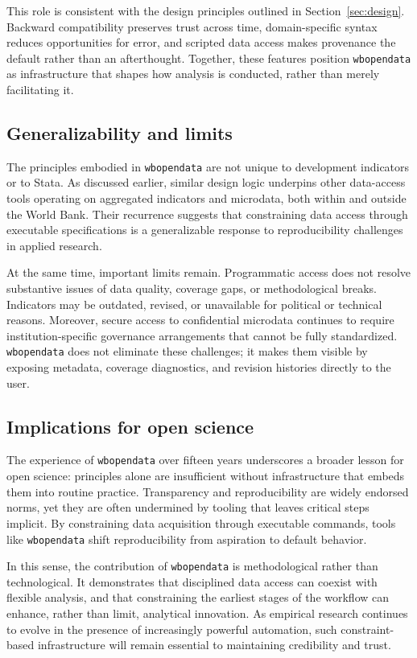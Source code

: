 \documentclass[bib]{statapress}
\begin{document}
This role is consistent with the design principles outlined in Section~\ref{sec:design}.
Backward compatibility preserves trust across time, domain-specific syntax
reduces opportunities for error, and scripted data access makes provenance the
default rather than an afterthought. Together, these features position
\texttt{wbopendata} as infrastructure that shapes how analysis is conducted,
rather than merely facilitating it.

\subsection{Generalizability and limits}

The principles embodied in \texttt{wbopendata} are not unique to development
indicators or to Stata. As discussed earlier, similar design logic underpins
other data-access tools operating on aggregated indicators and microdata, both
within and outside the World Bank. Their recurrence suggests that constraining
data access through executable specifications is a generalizable response to
reproducibility challenges in applied research.

At the same time, important limits remain. Programmatic access does not resolve
substantive issues of data quality, coverage gaps, or methodological breaks.
Indicators may be outdated, revised, or unavailable for political or technical
reasons. Moreover, secure access to confidential microdata continues to require
institution-specific governance arrangements that cannot be fully standardized.
\texttt{wbopendata} does not eliminate these challenges; it makes them visible by
exposing metadata, coverage diagnostics, and revision histories directly to the
user.

\subsection{Implications for open science}

The experience of \texttt{wbopendata} over fifteen years underscores a broader
lesson for open science: principles alone are insufficient without
infrastructure that embeds them into routine practice. Transparency and
reproducibility are widely endorsed norms, yet they are often undermined by
tooling that leaves critical steps implicit. By constraining data acquisition
through executable commands, tools like \texttt{wbopendata} shift reproducibility
from aspiration to default behavior.

In this sense, the contribution of \texttt{wbopendata} is methodological rather
than technological. It demonstrates that disciplined data access can coexist
with flexible analysis, and that constraining the earliest stages of the
workflow can enhance, rather than limit, analytical innovation. As empirical
research continues to evolve in the presence of increasingly powerful
automation, such constraint-based infrastructure will remain essential to
maintaining credibility and trust.
\end{document}
